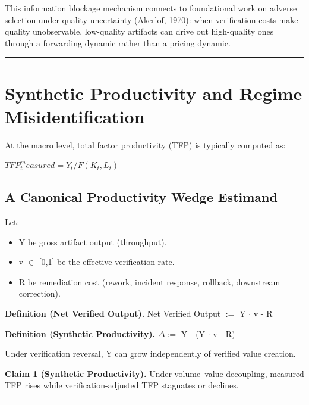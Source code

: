 \documentclass[11pt,a4paper]{article}
\providecommand{\tightlist}{\setlength{\itemsep}{0pt}\setlength{\parskip}{0pt}}
\begin{document}
This information blockage mechanism connects to foundational work on adverse selection under quality uncertainty (Akerlof, 1970): when verification costs make quality unobservable, low-quality artifacts can drive out high-quality ones through a forwarding dynamic rather than a pricing dynamic.

\begin{center}\rule{0.5\linewidth}{0.5pt}\end{center}

\hypertarget{synthetic-productivity-and-regime-misidentification}{%
\section{Synthetic Productivity and Regime Misidentification}\label{synthetic-productivity-and-regime-misidentification}}

At the macro level, total factor productivity (TFP) is typically computed as:

$TFP_t^measured = Y_t / F(K_t, L_t)$

\hypertarget{a-canonical-productivity-wedge-estimand}{%
\subsection{ A Canonical Productivity Wedge Estimand}\label{a-canonical-productivity-wedge-estimand}}

Let:

\begin{itemize}
\tightlist
\item
  Y be gross artifact output (throughput).
\item
  v $\in$ {[}0,1{]} be the effective verification rate.
\item
  R be remediation cost (rework, incident response, rollback, downstream correction).
\end{itemize}

\textbf{Definition (Net Verified Output).} Net Verified Output $:=$ Y $\cdot$ v - R

\textbf{Definition (Synthetic Productivity).} $\Delta :=$ Y - (Y $\cdot$ v - R)

Under verification reversal, Y can grow independently of verified value creation.

\textbf{Claim 1 (Synthetic Productivity).} Under volume--value decoupling, measured TFP rises while verification-adjusted TFP stagnates or declines.

\begin{center}\rule{0.5\linewidth}{0.5pt}\end{center}
\end{document}
